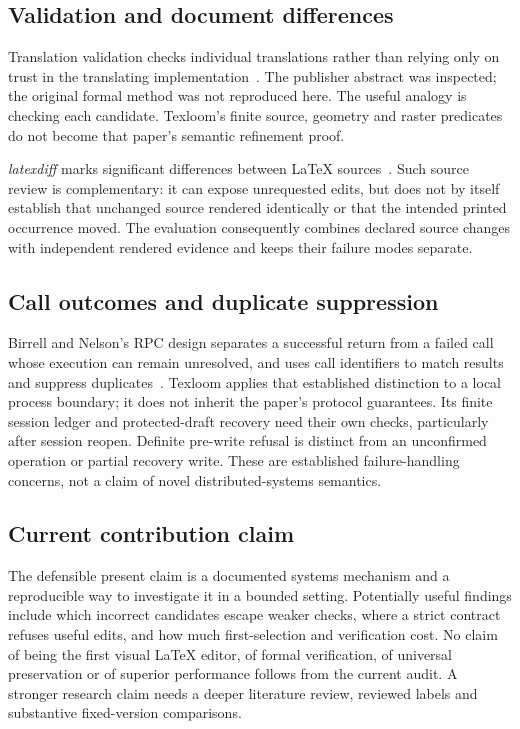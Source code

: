 \subsection{Validation and document differences}
Translation validation checks individual translations rather than relying
only on trust in the translating implementation~\cite{pnueli1998}. The
publisher abstract was inspected; the original formal method was not
reproduced here. The useful analogy is checking each candidate. Texloom's
finite source, geometry and raster predicates do not become that paper's
semantic refinement proof.

\emph{latexdiff} marks significant differences between LaTeX
sources~\cite{latexdiff}. Such source review is complementary: it can expose
unrequested edits, but does not by itself establish that unchanged source
rendered identically or that the intended printed occurrence moved. The
evaluation consequently combines declared source changes with independent
rendered evidence and keeps their failure modes separate.

\subsection{Call outcomes and duplicate suppression}
Birrell and Nelson's RPC design separates a successful return from a failed
call whose execution can remain unresolved, and uses call identifiers to match
results and suppress duplicates~\cite{birrell1984rpc}. Texloom applies that
established distinction to a local process boundary; it does not inherit the
paper's protocol guarantees. Its finite session ledger and protected-draft
recovery need their own checks, particularly after session reopen. Definite
pre-write refusal is distinct from an unconfirmed operation or partial
recovery write. These are established failure-handling concerns, not a claim
of novel distributed-systems semantics.

\subsection{Current contribution claim}
The defensible present claim is a documented systems mechanism and a
reproducible way to investigate it in a bounded setting. Potentially useful
findings include which incorrect candidates escape weaker checks, where a
strict contract refuses useful edits, and how much first-selection and
verification cost. No claim of being the first visual LaTeX editor, of formal
verification, of universal preservation or of superior performance follows
from the current audit. A stronger research claim needs a deeper literature
review, reviewed labels and substantive fixed-version comparisons.
